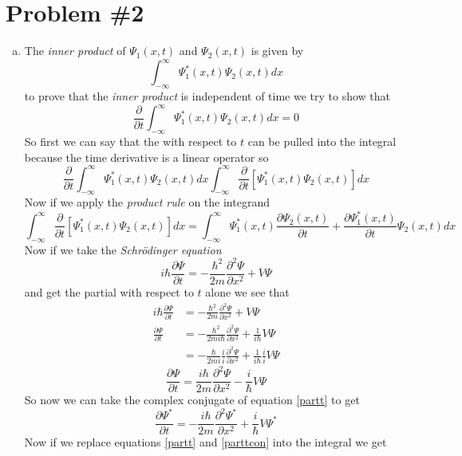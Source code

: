 \documentclass[11pt]{article}
\numberwithin{equation}{section}
\begin{document}
\section{Problem \#2}
\begin{enumerate}[(a)]
\item
The \emph{inner product} of $\Psi_1(x,t)$ and $\Psi_2(x,t)$ is given by
$$\int_{-\infty}^{\infty}\Psi_1^*(x,t)\Psi_2(x,t)dx$$
to prove that the \emph{inner product} is independent of time we try to show that
$$\frac{\partial}{\partial t}\int_{-\infty}^{\infty}\Psi_1^*(x,t)\Psi_2(x,t)dx = 0$$
So first we can say that the with respect to $t$ can be pulled into the integral because the time derivative is a linear operator so 
$$\frac{\partial}{\partial t}\int_{-\infty}^{\infty}\Psi_1^*(x,t)\Psi_2(x,t)dx \int_{-\infty}^{\infty}\frac{\partial}{\partial t}\left[\Psi_1^*(x,t)\Psi_2(x,t)\right]dx$$
Now if we apply the \emph{product rule} on the integrand 
$$\int_{-\infty}^{\infty}\frac{\partial}{\partial t}\left[\Psi_1^*(x,t)\Psi_2(x,t)\right]dx = \int_{-\infty}^{\infty}\Psi_1^*(x,t)\frac{\partial\Psi_2(x,t)}{\partial t} +\frac{\partial\Psi_1^*(x,t)}{\partial t}\Psi_2(x,t)dx$$
Now if we take the \emph{Schr\"{o}dinger equation}
\begin{equation}
i\hbar\frac{\partial \Psi}{\partial t} = -\frac{\hbar^2}{2m}\frac{\partial^2\Psi}{\partial x^2}+V\Psi
\label{schro}
\end{equation}
and get the partial with respect to $t$ alone we see that
\begin{align*}
i\hbar\frac{\partial \Psi}{\partial t} &= -\frac{\hbar^2}{2m}\frac{\partial^2\Psi}{\partial x^2}+V\Psi\\
\frac{\partial \Psi}{\partial t} &= -\frac{\hbar^2}{2mi\hbar}\frac{\partial^2\Psi}{\partial x^2}+\frac{1}{i\hbar}V\Psi\\
&= -\frac{\hbar}{2mi}\frac{i}{i}\frac{\partial^2\Psi}{\partial x^2}+\frac{1}{i\hbar}\frac{i}{i}V\Psi
\end{align*}
\begin{equation}
\frac{\partial \Psi}{\partial t} =\frac{i\hbar}{2m}\frac{\partial^2\Psi}{\partial x^2} - \frac{i}{\hbar}V\Psi
\label{partt}
\end{equation}
So now we can take the complex conjugate of equation \ref{partt} to get
\begin{equation}
\frac{\partial \Psi^*}{\partial t} = -\frac{i\hbar}{2m}\frac{\partial^2\Psi^*}{\partial x^2} + \frac{i}{\hbar}V\Psi^*
\label{parttcon}
\end{equation}
Now if we replace equations \ref{partt} and \ref{parttcon} into the integral we get

\end{enumerate}
\end{document}
